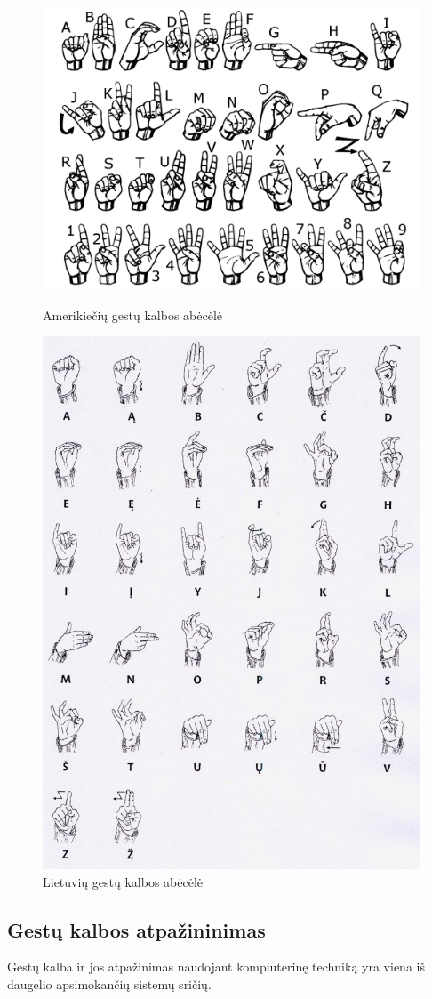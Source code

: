 \documentclass{VUMIFInfKursinis}
\begin{document}
\begin{figure}[H]
	\centering
	\begin{minipage}{.5\textwidth}
		\centering
		\includegraphics[width=.8\linewidth]{img/asl_alphabet}
		\caption{Amerikiečių gestų kalbos abėcėlė}
		\label{img:asl_alphabet}
	\end{minipage}%
	\begin{minipage}{.5\textwidth}
		\centering
		\includegraphics[width=.5\linewidth]{img/lsl_alphabet}
		\caption{Lietuvių gestų kalbos abėcėlė}
		\label{img:lsl_alphabet}
	\end{minipage}
\end{figure}

\subsection{Gestų kalbos atpažininimas}
Gestų kalba ir jos atpažinimas naudojant kompiuterinę techniką yra viena iš daugelio apsimokančių sistemų sričių. 
\end{document}
